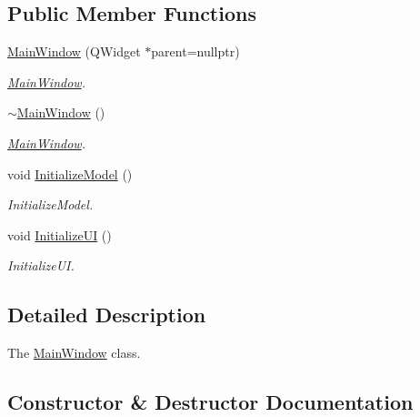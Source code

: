 \subsection*{Public Member Functions}
\begin{DoxyCompactItemize}
\item 
\hyperlink{class_main_window_a996c5a2b6f77944776856f08ec30858d}{Main\+Window} (Q\+Widget $\ast$parent=nullptr)
\begin{DoxyCompactList}\small\item\em \hyperlink{class_main_window}{Main\+Window}. \end{DoxyCompactList}\item 
\hyperlink{class_main_window_ae98d00a93bc118200eeef9f9bba1dba7}{$\sim$\+Main\+Window} ()
\begin{DoxyCompactList}\small\item\em \hyperlink{class_main_window}{Main\+Window}. \end{DoxyCompactList}\item 
void \hyperlink{class_main_window_ae17ca5d5ac5314191edb702fadcbb101}{Initialize\+Model} ()\hypertarget{class_main_window_ae17ca5d5ac5314191edb702fadcbb101}{}\label{class_main_window_ae17ca5d5ac5314191edb702fadcbb101}

\begin{DoxyCompactList}\small\item\em Initialize\+Model. \end{DoxyCompactList}\item 
void \hyperlink{class_main_window_af8cad047758d58a96e68bdbe3ed7d99f}{Initialize\+UI} ()\hypertarget{class_main_window_af8cad047758d58a96e68bdbe3ed7d99f}{}\label{class_main_window_af8cad047758d58a96e68bdbe3ed7d99f}

\begin{DoxyCompactList}\small\item\em Initialize\+UI. \end{DoxyCompactList}\end{DoxyCompactItemize}


\subsection{Detailed Description}
The \hyperlink{class_main_window}{Main\+Window} class. 

\subsection{Constructor \& Destructor Documentation}
